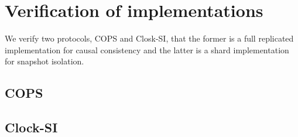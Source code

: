 \section{Verification of implementations}

We verify two protocols, COPS and Closk-SI, that the former is a full replicated implementation for causal consistency and the latter is a shard implementation for snapshot isolation.

\subsection{COPS}


\subsection{Clock-SI}

